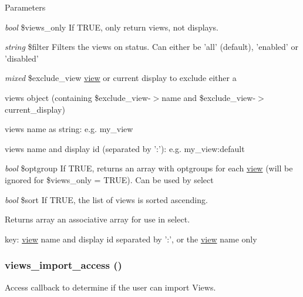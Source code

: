 \begin{DoxyParams}{Parameters}
\item[{\em bool}]\$views\_\-only If TRUE, only return views, not displays. \item[{\em string}]\$filter Filters the views on status. Can either be 'all' (default), 'enabled' or 'disabled' \item[{\em mixed}]\$exclude\_\-view \hyperlink{classview}{view} or current display to exclude either a
\begin{DoxyItemize}
\item views object (containing \$exclude\_\-view-\/$>$name and \$exclude\_\-view-\/$>$current\_\-display)
\item views name as string: e.g. my\_\-view
\item views name and display id (separated by ':'): e.g. my\_\-view:default 
\end{DoxyItemize}\item[{\em bool}]\$optgroup If TRUE, returns an array with optgroups for each \hyperlink{classview}{view} (will be ignored for \$views\_\-only = TRUE). Can be used by select \item[{\em bool}]\$sort If TRUE, the list of views is sorted ascending.\end{DoxyParams}
\begin{DoxyReturn}{Returns}
array an associative array for use in select.
\begin{DoxyItemize}
\item key: \hyperlink{classview}{view} name and display id separated by ':', or the \hyperlink{classview}{view} name only 
\end{DoxyItemize}
\end{DoxyReturn}
\hypertarget{views_8module_a01c92296a9a5d51e8e5e470068d7cd40}{
\subsubsection[{views\_\-import\_\-access}]{\setlength{\rightskip}{0pt plus 5cm}views\_\-import\_\-access ()}}
\label{views_8module_a01c92296a9a5d51e8e5e470068d7cd40}
Access callback to determine if the user can import Views.

